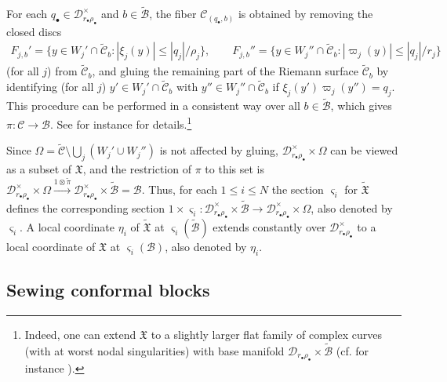\documentclass[12pt,a4paper,notitlepage]{article}
\theoremstyle{definition}
\theoremstyle{plain}
\newcommand{\fk}{\mathfrak}
\newcommand{\mc}{\mathcal}
\newcommand{\wtd}{\widetilde}
\newcommand{\sgm}{\varsigma}
\newcommand{\blt}{\bullet}
\numberwithin{equation}{section}
\begin{document}
For each $q_\blt\in\mc D_{r_\blt\rho_\blt}^\times$ and $b\in\wtd{\mc B}$, the fiber $\mc C_{(q_\blt,b)}$ is obtained by  removing the closed discs 
\begin{align*}
F_{j,b}'=\{y\in W_j'\cap\wtd{\mc C}_b:|\xi_j(y)|\leq |q_j|/\rho_j\},\qquad F_{j,b}''=\{y\in W_j''\cap\wtd{\mc C}_b:|\varpi_j(y)|\leq |q_j|/r_j\}	
\end{align*}
(for all $j$) from $\wtd{\mc C}_b$, and gluing the remaining part of the Riemann surface $\wtd {\mc C}_b$ by identifying (for all $j$) $y'\in W_j'\cap \wtd{\mc C}_b$ with $y''\in W_j''\cap\wtd{\mc C}_b$ if $\xi_j(y')\varpi_j(y'')=q_j$. This procedure can be performed in a consistent way over all $b\in\wtd{\mc B}$, which gives $\pi:\mc C\rightarrow\mc B$. See for instance \cite[Sec. 4]{Gui20} for details.\footnote{Indeed,  one can extend $\fk X$ to a slightly larger flat family of complex curves (with at worst nodal singularities) with base manifold $\mc D_{r_\blt\rho_\blt}\times\wtd{\mc B}$ (cf. for instance \cite[Sec. 4]{Gui20}).} 

Since $\Omega=\wtd{\mc C}\setminus \bigcup_j(W_j'\cup W_j'')$ is not affected by gluing, $\mc D_{r_\blt\rho_\blt}^\times\times\Omega$ can be viewed as a subset of $\fk X$, and the restriction of $\pi$ to this set is $\mc D_{r_\blt\rho_\blt}^\times\times\Omega\xrightarrow{1\otimes\wtd\pi}\mc D_{r_\blt\rho_\blt}^\times\times\wtd{\mc B}=\mc B$. Thus, for each $1\leq i\leq N$ the section $\sgm_i$ for $\wtd{\fk X}$  defines the corresponding section $1\times\sgm_i:\mc D_{r_\blt\rho_\blt}^\times\times\wtd{\mc B}\rightarrow \mc D_{r_\blt\rho_\blt}^\times\times\Omega$, also denoted by $\sgm_i$. A local coordinate $\eta_i$ of $\wtd{\fk X}$ at $\sgm_i(\wtd{\mc B})$ extends constantly over $\mc D_{r_\blt\rho_\blt}^\times$ to a local coordinate of $\fk X$ at $\sgm_i(\mc B)$, also denoted by $\eta_i$.





	
\subsection*{Sewing conformal blocks}
	
\end{document}

